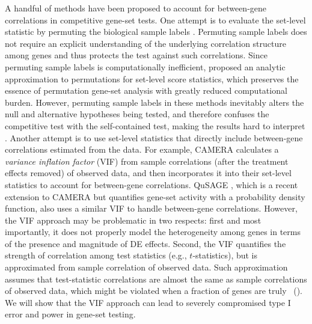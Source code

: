 	A handful of methods have been proposed to account for between-gene correlations in competitive 
	gene-set tests. One attempt is to evaluate the set-level statistic by permuting the biological 
	sample labels \citep{efron2007testing,subramanian2005gene}. Permuting sample labels
	does not require an explicit understanding of the underlying correlation structure among genes 
	and thus protects the test against such correlations. Since permuting sample labels is 
	computationally	inefficient, \citet{zhou2013empirical} proposed an analytic approximation to 
	permutations for set-level score statistics, which preserves the essence of permutation 
	gene-set analysis with greatly reduced computational burden. However, permuting sample labels 
	in these methods inevitably alters the null and alternative hypotheses being tested, and 
	therefore confuses the competitive test with the self-contained test, making the results hard 
	to interpret \citep{goeman2007analyzing, khatri2012ten, wu2012camera}. Another attempt is to 
	use set-level statistics that directly include between-gene correlations estimated from the 
	data. For example, CAMERA \citep{wu2012camera} calculates a \textit{variance inflation factor} 
	(VIF) from sample correlations (after the treatment effects removed) of observed data, and then 
	incorporates it into their set-level statistics to account for between-gene correlations. 
	QuSAGE \citep{yaari2013quantitative}, which is a recent	extension to CAMERA but quantifies 
	gene-set activity with a probability density function, also uses a similar VIF to handle 
	between-gene correlations. However, the VIF approach may be problematic in two respects: first 
	and most importantly, it does not properly model the heterogeneity among genes in 
	terms of the presence and magnitude of DE effects. 
	Second, the VIF quantifies the strength of 
	correlation among test statistics (e.g., 
	$t$-statistics), but is approximated from sample correlation of observed 
	data. Such approximation assumes that test-statistic correlations are almost the same as sample 
	correlations of observed data, which might be violated when a fraction of 
	genes are  truly \DED~(\thepapertobefinished). We will show that the VIF approach can lead to 
	severely compromised type I error and power in gene-set testing. 
	
